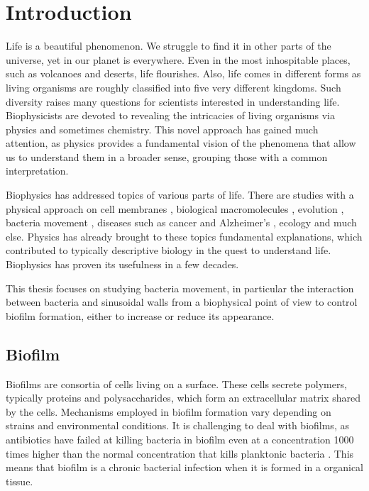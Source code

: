 \chapter{Introduction}

Life is a beautiful phenomenon. We struggle to find it in other parts of the universe, yet in our planet is everywhere. Even in the most inhospitable places, such as volcanoes and deserts, life flourishes. Also, life comes in different forms as living organisms are roughly classified into five very different kingdoms. Such diversity raises many questions for scientists interested in understanding life. Biophysicists are devoted to revealing the intricacies of living organisms via physics and sometimes chemistry. This novel approach has gained much attention, as physics provides a fundamental vision of the phenomena that allow us to understand them in a broader sense, grouping those with a common interpretation.

Biophysics has addressed topics of various parts of life. There are studies with a physical approach on cell membranes \cite{Nguyen2021PhotocatalyticSynthesis,Jin2020MechanosensitiveMechanisms,Janmey2006BiophysicalMembranes}, biological macromolecules \cite{Allewell2013MolecularSciences, Allewell2008MethodsFunction, Fierz2019BiophysicsDynamics}, evolution \cite{Sikosek2014BiophysicsBiophysics}, bacteria movement \cite{Lauga2020TheMotility, Ananthakrishnan2007TheMovement}, diseases such as cancer and Alzheimer's \cite{White2019TheCancer, Weickenmeier2019ASclerosis}, ecology \cite{Helmuth2002HowBiophysics} and much else. Physics has already brought to these topics fundamental explanations, which contributed to typically descriptive biology in the quest to understand life. Biophysics has proven its usefulness in a few decades.

This thesis focuses on studying bacteria movement, in particular the interaction between bacteria and sinusoidal walls from a biophysical point of view to control biofilm formation, either to increase or reduce its appearance.

\section{Biofilm}

Biofilms are consortia of cells living on a surface. These cells secrete polymers, typically proteins and polysaccharides, which form an extracellular matrix shared by the cells. Mechanisms employed in biofilm formation vary depending on strains and environmental conditions. It is challenging to deal with biofilms, as antibiotics have failed at killing bacteria in biofilm even at a concentration 1000 times higher than the normal concentration that kills planktonic bacteria \cite{Costerton1987BacterialDisease.}. This means that biofilm is a chronic bacterial infection when it is formed in a organical tissue.

